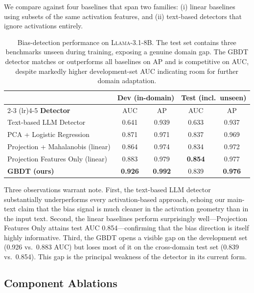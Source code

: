 \documentclass[11pt]{article}
\begin{document}
We compare against four baselines that span two families: (i) linear baselines using subsets of the same activation features, and (ii) text-based detectors that ignore activations entirely.

\begin{table}[h!]
\centering
\small
\setlength{\tabcolsep}{6pt}
\caption{Bias-detection performance on \textsc{Llama-3.1-8B}. The test set contains three benchmarks unseen during training, exposing a genuine domain gap. The GBDT detector matches or outperforms all baselines on AP and is competitive on AUC, despite markedly higher development-set AUC indicating room for further domain adaptation.}
\label{tab:detection_baselines}
\begin{tabular}{l cc cc}
\toprule
& \multicolumn{2}{c}{\textbf{Dev (in-domain)}} & \multicolumn{2}{c}{\textbf{Test (incl.\ unseen)}} \\
\cmidrule(lr){2-3} \cmidrule(lr){4-5}
\textbf{Detector} & AUC & AP & AUC & AP \\
\midrule
Text-based LLM Detector & 0.641 & 0.939 & 0.633 & 0.937 \\
PCA + Logistic Regression & 0.871 & 0.971 & 0.837 & 0.969 \\
Projection + Mahalanobis (linear) & 0.864 & 0.974 & 0.834 & 0.972 \\
Projection Features Only (linear) & 0.883 & 0.979 & \textbf{0.854} & 0.977 \\
\midrule
\textbf{GBDT (ours)} & \textbf{0.926} & \textbf{0.992} & 0.839 & \textbf{0.976} \\
\bottomrule
\end{tabular}
\end{table}

Three observations warrant note. First, the text-based LLM detector substantially underperforms every activation-based approach, echoing our main-text claim that the bias signal is much cleaner in the activation geometry than in the input text. Second, the linear baselines perform surprisingly well---Projection Features Only attains test AUC 0.854---confirming that the bias direction is itself highly informative. Third, the GBDT opens a visible gap on the development set (0.926 vs.\ 0.883 AUC) but loses most of it on the cross-domain test set (0.839 vs.\ 0.854). This gap is the principal weakness of the detector in its current form.

\subsection{Component Ablations}
\label{app:detection_ablation}
\end{document}
